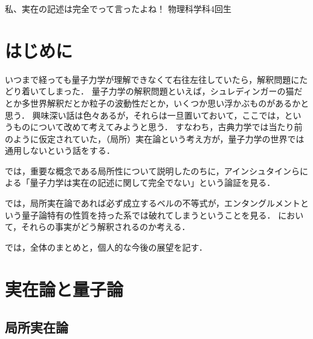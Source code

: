 \documentclass[10pt,b5paper,papersize,dvipdfmx]{jsbook}
\begin{document}

\renewcommand\textcolor[2]{#2} %

\newif\ifsecI
\newif\ifsecII

\secItrue
\secIItrue

\kaishititle%
  {私、実在の記述は完全でって言ったよね！}%
  {物理科学科4回生}%
  {}%

\section*{はじめに}
いつまで経っても量子力学が理解できなくて右往左往していたら，解釈問題にたどり着いてしまった．
量子力学の解釈問題といえば，シュレディンガーの猫だとか多世界解釈だとか粒子の波動性だとか，いくつか思い浮かぶものがあるかと思う．
興味深い話は色々あるが，それらは一旦置いておいて，ここでは，というものについて改めて考えてみようと思う．
すなわち，古典力学では当たり前のように仮定されていた，（局所）実在論という考え方が，量子力学の世界では通用しないという話をする．\par
{}では，重要な概念である局所性について説明したのちに，アインシュタインらによる「量子力学は実在の記述に関して完全でない」という論証を見る．\par
{}では，局所実在論であれば必ず成立するベルの不等式が，エンタングルメントという量子論特有の性質を持った系では破れてしまうということを見る．
において，それらの事実がどう解釈されるのか考える．\par
{}では，全体のまとめと，個人的な今後の展望を記す．\par



\ifsecI
\section{実在論と量子論}\label{sec:1}

%
\subsection{局所実在論} %
\end{document}
